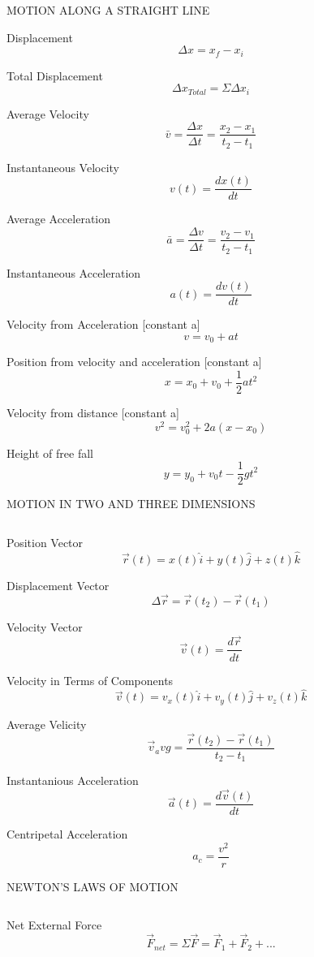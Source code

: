 \documentclass[12pt, letterpaper, twoside]{article}
\begin{document}
\newpage

MOTION ALONG A STRAIGHT LINE
$$ $$



Displacement
$$\Delta x = x_f - x_i$$


Total Displacement
$$\Delta x_{Total} = \Sigma \Delta x_i$$

Average Velocity
$$\bar{v} = \frac{\Delta x}{\Delta t} = \frac{x_2 - x_1}{t_2 - t_1}$$

Instantaneous Velocity
$$v(t) = \frac{dx(t)}{dt}$$

Average Acceleration
$$\bar{a} = \frac{\Delta v}{\Delta t} = \frac{v_2 - v_1}{t_2 - t_1}$$

Instantaneous Acceleration
$$a(t) = \frac{dv(t)}{dt}$$

Velocity from Acceleration [constant a]
$$v = v_0 + at$$

Position from velocity and acceleration [constant a]
$$x = x_0 + v_0 + \frac{1}{2} a t^2$$

Velocity from distance [constant a]
$$v^2 = v_0^2 + 2a(x - x_0)$$

Height of free fall
$$y = y_0 + v_0 t - \frac{1}{2} g t^2$$


\newpage

MOTION IN TWO AND THREE DIMENSIONS

$$ $$  

Position Vector
$$\overrightarrow{r}(t) = x(t) \hat{i} + y(t) \hat{j} + z(t) \hat{k}$$


Displacement Vector
$$\Delta \overrightarrow{r}=\overrightarrow{r}(t_2) -  \overrightarrow{r}(t_1)$$


Velocity Vector
$$\overrightarrow{v}(t)= \frac{d \overrightarrow{r}}{dt}$$


Velocity in Terms of Components
$$\overrightarrow{v}(t) = v_x(t) \hat{i} + v_y(t) \hat{j} + v_z(t) \hat{k}$$


Average Velicity
$$\overrightarrow{v}_avg = \frac{\overrightarrow{r}(t_2) -  \overrightarrow{r}(t_1)}{t_2 - t_1}$$


Instantanious Acceleration
$$\overrightarrow{a}(t)= \frac{d \overrightarrow{v}(t)}{dt}$$


Centripetal Acceleration
$$a_c = \frac{v^2}{r}$$



\newpage

NEWTON'S LAWS OF MOTION

$$ $$


Net External Force
$$\overrightarrow{F}_{net} = \Sigma \overrightarrow{F} = \overrightarrow{F}_1+\overrightarrow{F}_2 +...$$
\end{document}
